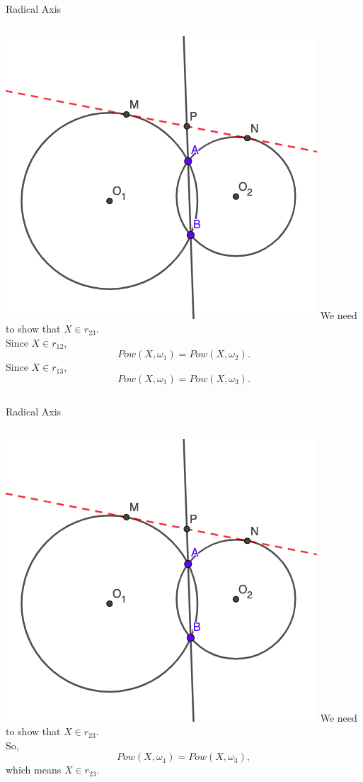 \documentclass{beamer}
\begin{document}
\begin{frame}{Radical Axis}
	\begin{columns}
		\includegraphics[scale=0.4]{rad3.png}
		We need to show that $X\in r_{23}$.\\
		\phantom{Spacing}
		Since $X\in r_{12}$,
		\[
			Pow(X, \omega_1) = Pow(X,\omega_2)
		.\] 
		Since $X\in r_{13}$,
		\[
			Pow(X, \omega_1) = Pow(X, \omega_3)
		.\] 
	\end{columns}
\end{frame}
\begin{frame}{Radical Axis}
	\begin{columns}
		\column{0.6\textwidth}
		\includegraphics[scale=0.4]{rad3.png}
		\column{0.4\textwidth}
		We need to show that $X\in r_{23}$.\\
		\phantom{Spacing}
		So, 
		\[
			Pow(X, \omega_1) = Pow(X, \omega_3)
		,\] which means $X\in r_{23}$.
	\end{columns}
\end{frame}
\end{document}
